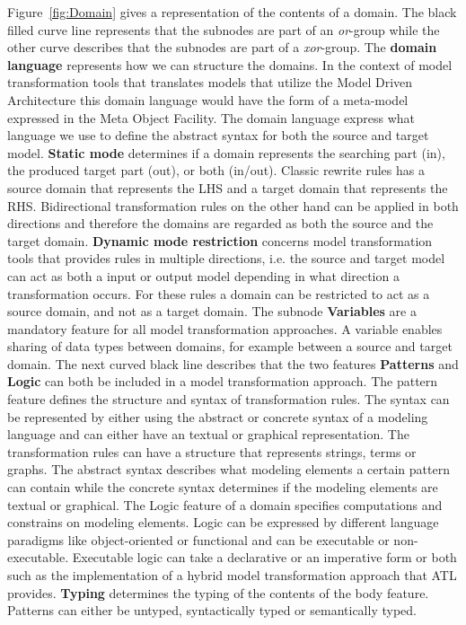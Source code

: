 
Figure~\ref{fig:Domain} gives a representation of the contents of a domain.
The black filled curve line represents that the subnodes are part of an
\textit{or}-group while the other curve describes that the subnodes are part of
a \textit{xor}-group.
The \textbf{domain language} represents how we can structure the domains. In the
context of model transformation tools that translates models that utilize the Model
Driven Architecture this domain language would have the form of a meta-model
expressed in the Meta Object Facility. The domain language express what language we use to
define the abstract syntax for both the source and target model. \textbf{Static
mode} determines if a domain represents the searching part (in), the produced
target part (out), or both (in/out). Classic rewrite rules has a source domain
that represents the LHS and a target domain that represents the RHS. Bidirectional transformation
rules on the other hand can be applied in both directions and therefore the 
domains are regarded as both the source and the target domain.
\textbf{Dynamic mode restriction} concerns model transformation tools that provides rules in
multiple directions, i.e. the source and target model can act as
both a input or output model depending in what direction a transformation
occurs. For these rules a domain can be restricted to act as a source domain,
and not as a target domain.
The subnode \textbf{Variables} are a mandatory feature for all model
transformation approaches. A variable enables sharing of data types between domains, for
example between a source and target domain. The next curved black line describes
that the two features \textbf{Patterns} and \textbf{Logic} can both be included
in a model transformation approach. The pattern feature defines the
structure and syntax of transformation rules. The syntax can be represented by
either using the abstract or concrete syntax of a modeling language and can
either have an textual or graphical representation. The transformation rules can
have a structure that represents strings, terms or graphs. The abstract syntax
describes what modeling elements a certain pattern can contain while the
concrete syntax determines if the modeling elements are textual or graphical.
The Logic feature of a domain specifies computations and constrains on modeling
elements. Logic can be expressed by different language paradigms like
object-oriented or functional and can be executable or non-executable.
Executable logic can take a declarative or an imperative form or both such as
the implementation of a hybrid model transformation approach that ATL provides. 
\textbf{Typing} determines the typing of the contents of the body feature.
Patterns can either be untyped, syntactically typed or semantically typed.

